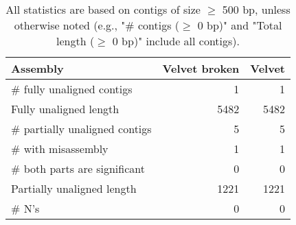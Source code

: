 \documentclass[12pt,a4paper]{article}
\begin{document}
\begin{table}[ht]
\begin{center}
\caption{All statistics are based on contigs of size $\geq$ 500 bp, unless otherwise noted (e.g., "\# contigs ($\geq$ 0 bp)" and "Total length ($\geq$ 0 bp)" include all contigs).}
\begin{tabular}{|l*{2}{|r}|}
\hline
Assembly & Velvet broken & Velvet \\ \hline
\# fully unaligned contigs & 1 & 1 \\ \hline
Fully unaligned length & 5482 & 5482 \\ \hline
\# partially unaligned contigs & 5 & 5 \\ \hline
\hspace{5mm}\# with misassembly & 1 & 1 \\ \hline
\hspace{5mm}\# both parts are significant & 0 & 0 \\ \hline
Partially unaligned length & 1221 & 1221 \\ \hline
\# N's & 0 & 0 \\ \hline
\end{tabular}
\end{center}
\end{table}
\end{document}
